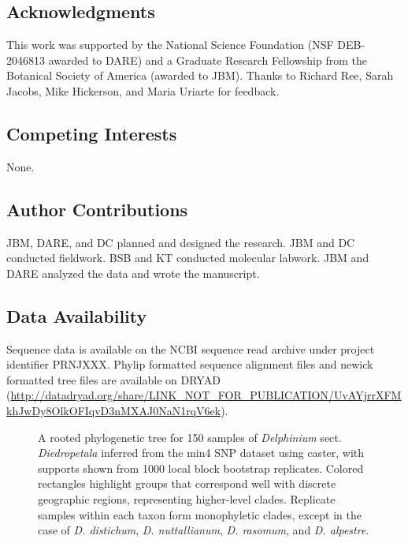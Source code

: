 \documentclass[11pt]{article}
\newcommand{\beginsupplement}{%
	\setcounter{table}{0}
	\setcounter{figure}{0}
	\renewcommand{\thetable}{S\arabic{table}}%
	\renewcommand{\thefigure}{S\arabic{figure}}%
}
\begin{document}

\subsection{Acknowledgments}
This work was supported by the National Science Foundation (NSF DEB-2046813 awarded to DARE) and a Graduate Research Fellowship from the Botanical Society of America (awarded to JBM). Thanks to Richard Ree, Sarah Jacobs, Mike Hickerson, and Maria Uriarte for feedback.

\subsection{Competing Interests} 
None.

\subsection{Author Contributions}
JBM, DARE, and DC planned and designed the research. JBM and DC conducted fieldwork. BSB and KT conducted molecular labwork. JBM and DARE analyzed the data and wrote the manuscript.


\subsection{Data Availability}
Sequence data is available on the NCBI sequence read archive under project identifier PRNJXXX. Phylip formatted sequence alignment files and newick formatted tree files are available on DRYAD (\url{http://datadryad.org/share/LINK_NOT_FOR_PUBLICATION/UvAYjrrXFMkhJwDy8OlkOFIqvD3nMXAJ0NaN1rqV6ek}).



  


\beginsupplement

\begin{figure}[p]
	\centering
      
	\caption{
		A rooted phylogenetic tree for 150 samples of \emph{Delphinium} sect. \emph{Diedropetala}
		inferred from the min4 SNP dataset using caster, with supports shown from
		1000 local block bootstrap replicates. 
		Colored rectangles highlight
		groups that correspond well with discrete geographic regions, representing higher-level 
		clades. Replicate samples within each taxon form monophyletic clades, except in the case
		of \emph{D. distichum}, \emph{D. nuttallianum}, \emph{D. rasomum}, and \emph{D. alpestre}.
	}
	\label{fig:S1}
\end{figure}
\end{document}

